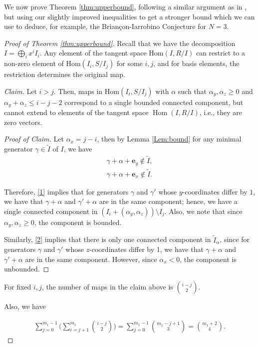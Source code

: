 \documentclass[11pt,a4paper,leqno,noamsfonts]{amsart}
\numberwithin{equation}{section}
\newcommand\Hom{\operatorname{Hom}}
\theoremstyle{definition}
\theoremstyle{thm}
\theoremstyle{ex}
\theoremstyle{sol}
\begin{document}
We now prove Theorem \ref{thm:upperbound}, following a similar argument as in \cite{Ramkumar-Sammartano}, but using our slightly improved inequalities to get a stronger bound which we can use to deduce, for example, the Briançon-Iarrobino Conjecture for $N=3$.
\begin{proof}[Proof of Theorem \ref{thm:upperbound}]
Recall that we have the decomposition $I=\bigoplus_ix^iI_i$. Any element of the tangent space $\mathrm{Hom}(I,R/I)$ can restrict to a non-zero element of $\mathrm{Hom}(I_i,S/I_j)$ for some $i,j$, and for basis elements, the restriction determines the original map. 

\emph{Claim.} Let $i>j$. Then, maps in $\mathrm{Hom}(I_i,S/I_j)$ with $\alpha$ such that $\alpha_y,\alpha_z\geq0$ and $\alpha_y+\alpha_z\leq i-j-2$ correspond to a single bounded connected component, but cannot extend to elements of the tangent space $\Hom(I,R/I)$, i.e., they are zero vectors.

\begin{proof}[Proof of Claim]
    Let $\alpha_x=j-i$, then by Lemma \ref{Lem:bound} for any minimal generator $\gamma\in\tilde{I}$ of $I$, we have
   \begin{align}
\gamma+\alpha+\mathbf{e}_y \notin \tilde{I},\label{1}\\
\gamma+\alpha+\mathbf{e}_x\notin\tilde{I}\label{2}.
   \end{align}
   
   Therefore, \eqref{1} implies that for generators $\gamma$ and $\gamma'$ whose $y$-coordinates differ by $1$, we have that $\gamma+\alpha$ and $\gamma'+\alpha$ are in the same component; hence, we have a single connected component in $(I_i+(\alpha_y,\alpha_z))\setminus I_j$. Also, we note that since $\alpha_y,\alpha_z\geq0$, the component is bounded.

    Similarly, \eqref{2} implies that there is only one connected component in $\tilde{I}_\alpha$, since for generators $\gamma$ and $\gamma'$ whose $z$-coordinates differ by 1, we have that  $\gamma+\alpha$ and $\gamma'+\alpha$ are in the same component. However, since $\alpha_x<0$, the component is unbounded.
\end{proof}
For fixed $i,j$, the number of maps in the claim above is $\binom{i-j}{2}$.

Also, we have 

\begin{align}\label{eq:doublebinomial}
    \sum_{j=0}^{m_1-1}\Bigg(\sum_{i=j+1}^{m_1}\binom{i-j}{2}\Bigg)= \sum_{j=0}^{m_1-1}{m_1-j+1\choose 3}={m_1+2 \choose 4}.
\end{align}


\end{proof}
\end{document}
